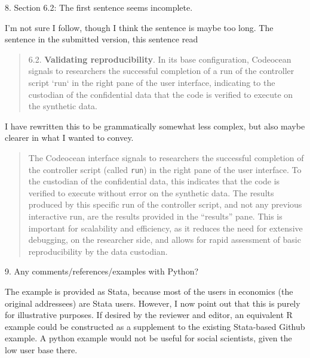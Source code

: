 \begin{referee}
8.
Section 6.2: The first sentence seems incomplete.

\end{referee}

\begin{response}
I'm not sure I follow, though I think the sentence is maybe too long. The sentence in the submitted version, this sentence read 
    \begin{quote}
6.2. \textbf{Validating reproducibility}. In its base configuration, Codeocean signals to researchers the
successful completion of a run of the controller script ‘run‘ in the right pane of the user interface,
indicating to the custodian of the confidential data that the code is verified to execute on the
synthetic data.
\end{quote}

I have rewritten this to be grammatically somewhat less complex, but also maybe clearer in what I wanted to convey.

\begin{quote}
    The Codeocean interface signals to researchers the successful completion  of the controller script (called \texttt{run}) in the right pane of the user interface. To the custodian of the confidential data, this indicates that the code is verified to execute without error on the synthetic data. The results produced by this specific run of the controller script, and not any previous interactive run, are the results provided in the ``results'' pane. This is important for scalability and efficiency, as it reduces the need for extensive debugging, on the researcher side, and allows for rapid assessment of basic reproducibility by the data custodian.
\end{quote}

\end{response}


\begin{referee}

9.
Any comments/references/examples with Python?

\end{referee}

\begin{response}
    The example is provided as Stata, because most of the users in economics (the original addressees) are Stata users. However, I now point out that this is purely for illustrative purposes. If desired by the reviewer and editor, an equivalent R example could be constructed as a supplement to the existing Stata-based Github example. A python example would not be useful for social scientists, given the low user base there.
\end{response}